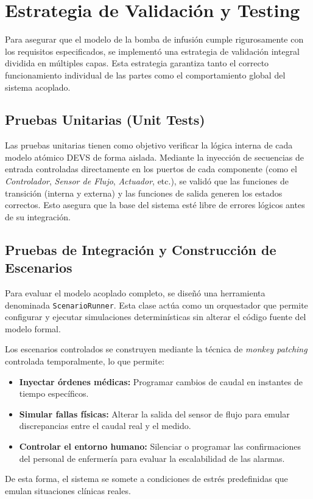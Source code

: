 \section{Estrategia de Validación y Testing}

Para asegurar que el modelo de la bomba de infusión cumple rigurosamente con los requisitos especificados, se implementó una estrategia de validación integral dividida en múltiples capas. Esta estrategia garantiza tanto el correcto funcionamiento individual de las partes como el comportamiento global del sistema acoplado.

\subsection{Pruebas Unitarias (Unit Tests)}
Las pruebas unitarias tienen como objetivo verificar la lógica interna de cada modelo atómico DEVS de forma aislada. Mediante la inyección de secuencias de entrada controladas directamente en los puertos de cada componente (como el \textit{Controlador}, \textit{Sensor de Flujo}, \textit{Actuador}, etc.), se validó que las funciones de transición (interna y externa) y las funciones de salida generen los estados correctos. Esto asegura que la base del sistema esté libre de errores lógicos antes de su integración.

\subsection{Pruebas de Integración y Construcción de Escenarios}
Para evaluar el modelo acoplado completo, se diseñó una herramienta denominada \texttt{ScenarioRunner}. Esta clase actúa como un orquestador que permite configurar y ejecutar simulaciones determinísticas sin alterar el código fuente del modelo formal. 

Los escenarios controlados se construyen mediante la técnica de \textit{monkey patching} controlada temporalmente, lo que permite:
\begin{itemize}
    \item \textbf{Inyectar órdenes médicas:} Programar cambios de caudal en instantes de tiempo específicos.
    \item \textbf{Simular fallas físicas:} Alterar la salida del sensor de flujo para emular discrepancias entre el caudal real y el medido.
    \item \textbf{Controlar el entorno humano:} Silenciar o programar las confirmaciones del personal de enfermería para evaluar la escalabilidad de las alarmas.
\end{itemize}
De esta forma, el sistema se somete a condiciones de estrés predefinidas que emulan situaciones clínicas reales.


